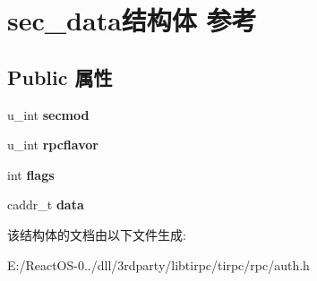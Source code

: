 \hypertarget{structsec__data}{}\section{sec\+\_\+data结构体 参考}
\label{structsec__data}
\subsection*{Public 属性}
\begin{DoxyCompactItemize}
\item 
\mbox{\label{structsec__data_a18553aeb3d9ece8a2ad377bf16a7e8aa}} 
u\+\_\+int {\bfseries secmod}
\item 
\mbox{\label{structsec__data_af9ac7bb2d1c07228d47c0dbf9d6c1994}} 
u\+\_\+int {\bfseries rpcflavor}
\item 
\mbox{\label{structsec__data_a0db72935af9954559b144ed1ef2b0105}} 
int {\bfseries flags}
\item 
\mbox{\label{structsec__data_a1c1dab5f5ba76fc8b3b37b7a1059aa50}} 
caddr\+\_\+t {\bfseries data}
\end{DoxyCompactItemize}


该结构体的文档由以下文件生成\+:\begin{DoxyCompactItemize}
\item 
E\+:/\+React\+O\+S-\/0../dll/3rdparty/libtirpc/tirpc/rpc/auth.\+h\end{DoxyCompactItemize}
